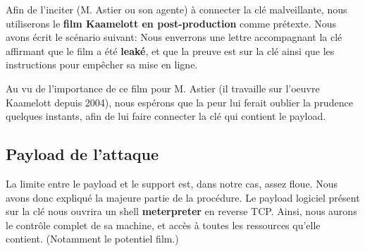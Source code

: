 Afin de l'inciter (M. Astier ou son agente) à connecter la clé malveillante, nous utiliserons le \textbf{film Kaamelott en post-production} comme prétexte. 
Nous avons écrit le scénario suivant: Nous enverrons une lettre accompagnant la clé affirmant que le film a été \textbf{leaké}, et que la preuve est sur la clé ainsi que les instructions pour empêcher sa mise en ligne.

Au vu de l'importance de ce film pour M. Astier (il travaille sur l'oeuvre Kaamelott depuis 2004), nous espérons que la peur lui ferait oublier la prudence quelques instants, afin de lui faire connecter la clé qui contient le payload.
\subsection{Payload de l'attaque}

La limite entre le payload et le support est, dans notre cas, assez floue. Nous avons donc expliqué la majeure partie de la procédure.
Le payload logiciel présent sur la clé nous ouvrira un shell \textbf{meterpreter} en reverse TCP. Ainsi, nous aurons le contrôle complet de sa machine, et accès à toutes les ressources qu'elle contient. (Notamment le potentiel film.)
